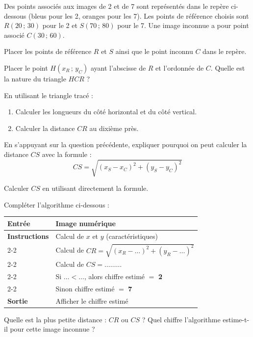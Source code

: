 Des points associés aux images de 2 et de 7 sont représentés dans le repère ci-dessous
	(bleus pour les 2, oranges pour les 7).
	Les points de référence choisis sont $R(20\,;\,30)$ pour le 2 et $S(70\,;\,80)$ pour le 7.
	Une image inconnue a pour point associé $C(30\,;\,60)$.

	\begin{MADenumerate}

		\item Placer les points de référence $R$ et $S$ ainsi que le point inconnu $C$ dans le repère.

		\item Placer le point $H(x_R\,;\,y_C)$ ayant l'abscisse de $R$ et l'ordonnée de $C$.
		Quelle est la nature du triangle $HCR$ ?

		\item En utilisant le triangle tracé :
		\begin{enumerate}
			\item Calculer les longueurs du côté horizontal et du côté vertical.
			\item Calculer la distance $CR$ au dixième près.
		\end{enumerate}

		\item En s'appuyant sur la question précédente, expliquer pourquoi on peut
		calculer la distance $CS$ avec la formule :
		\[
			CS = \sqrt{(x_S - x_C)^2 + (y_S - y_C)^2}
		\]

		\item Calculer $CS$ en utilisant directement la formule.

		\item Compléter l'algorithme ci-dessous :

		\begin{center}
			\begin{tabular}{|l|l|}
				\hline
				\textbf{Entrée}       & Image numérique                                             \\ \hline
				\textbf{Instructions} & Calcul de $x$ et $y$ (caractéristiques)                     \\ \cline{2-2}
				                      & Calcul de $CR = \sqrt{(x_R - \ldots)^2 + (y_R - \ldots)^2}$ \\ \cline{2-2}
				                      & Calcul de $CS = \ldots\ldots\ldots$                         \\ \cline{2-2}
				                      & Si $\ldots < \ldots$, alors chiffre estimé $=$ \textbf{2}   \\ \cline{2-2}
				                      & Sinon chiffre estimé $=$ \textbf{7}                         \\ \hline
				\textbf{Sortie}       & Afficher le chiffre estimé                                  \\ \hline
			\end{tabular}
		\end{center}

		\item Quelle est la plus petite distance : $CR$ ou $CS$ ?
		Quel chiffre l'algorithme estime-t-il pour cette image inconnue ?

	\end{MADenumerate}


